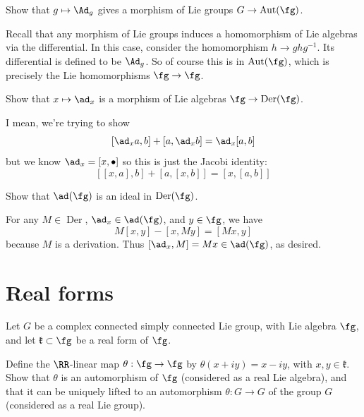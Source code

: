 \documentclass[11pt, headheight=30pt]{scrartcl}
\DeclareMathOperator{\Aut}{Aut}
\DeclareMathOperator{\Der}{Der}
\begin{document}
\begin{prob}
    Show that $g \mapsto \Ad_g$ gives a morphism of Lie groups $G \to \Aut(\fg)$.
\end{prob}

Recall that any morphism of Lie groups induces a homomorphism of Lie
algebras via the differential. In this case, consider the homomorphism
$h\to ghg^{-1}$. Its differential is defined to be $\Ad_g$. So
of course this is in $\Aut(\fg)$, which is precisely the Lie homomorphisms
$\fg\to \fg$.

\begin{prob}
    Show that $x \mapsto \ad_x$ is a morphism of Lie algebras $\fg \to \Der(\fg)$.
\end{prob}

I mean, we're trying to show
\[
    [\ad_xa,b] + [a,\ad_x b] = \ad_x[a,b]
\]
but we know $\ad_x = [x, \bullet]$ so this is just the Jacobi identity:
\[
    [[x,a],b]+[a,[x,b]] = [x,[a,b]]
\]

\begin{prob}
    Show that $\ad(\fg)$ is an ideal in $\Der(\fg)$.
\end{prob}


For any $M\in \Der$, $\ad_x\in \ad(\fg)$, and $y\in \fg$,
we have
\[
    M[x,y] - [x,My] = [Mx,y]
\]
because $M$ is a derivation. Thus
$[\ad_x, M] = Mx\in \ad(\fg)$, as desired.


\section{Real forms}
\begin{prob}
    Let $G$ be a complex connected simply connected Lie group, with Lie algebra $\fg$, and let
    $\mathfrak{k} \subset \fg$ be a real form of $\fg$.
    
    Define the $\RR$-linear map $\theta : \fg \to \fg$ by $\theta(x + iy) = x - iy$,
    with $x, y \in \mathfrak{k}$. Show that
    $\theta$ is an automorphism of $\fg$ (considered as a real Lie algebra), and that it can be
    uniquely lifted to an automorphism $\theta : G \to G$ of the group $G$ (considered as a real
    Lie group).
\end{prob}
\end{document}
